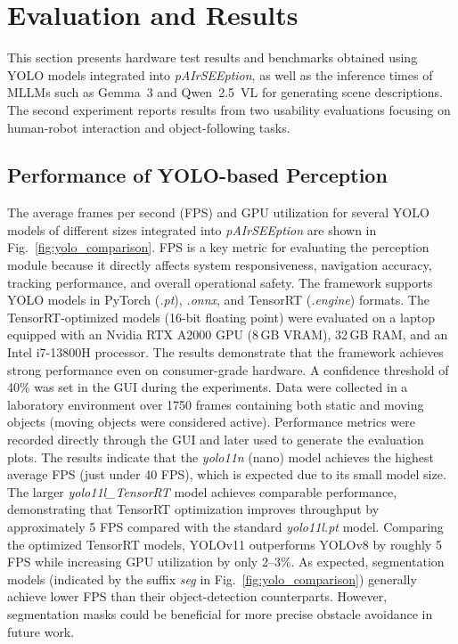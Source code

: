 \documentclass[lettersize,journal]{IEEEtran}
\begin{document}
\section{Evaluation and Results}
\label{sec:experiments}

This section presents hardware test results and benchmarks obtained using YOLO models integrated into \textit{pAIrSEEption}, as well as the inference times of MLLMs such as Gemma~3 and Qwen~2.5~VL for generating scene descriptions. The second experiment reports results from two usability evaluations focusing on human-robot interaction and object-following tasks.

\subsection{Performance of YOLO-based Perception}

The average frames per second (FPS) and GPU utilization for several YOLO models of different sizes integrated into \textit{pAIrSEEption} are shown in Fig.~\ref{fig:yolo_comparison}. FPS is a key metric for evaluating the perception module because it directly affects system responsiveness, navigation accuracy, tracking performance, and overall operational safety.
The framework supports YOLO models in PyTorch (\textit{.pt}), \textit{.onnx}, and TensorRT (\textit{.engine}) formats. The TensorRT-optimized models (16-bit floating point) were evaluated on a laptop equipped with an Nvidia RTX A2000 GPU (8\,GB VRAM), 32\,GB RAM, and an Intel i7-13800H processor. The results demonstrate that the framework achieves strong performance even on consumer-grade hardware.
A confidence threshold of 40\% was set in the GUI during the experiments. Data were collected in a laboratory environment over 1750 frames containing both static and moving objects (moving objects were considered active). Performance metrics were recorded directly through the GUI and later used to generate the evaluation plots.
The results indicate that the \textit{yolo11n} (nano) model achieves the highest average FPS (just under 40 FPS), which is expected due to its small model size. The larger \textit{yolo11l\_TensorRT} model achieves comparable performance, demonstrating that TensorRT optimization improves throughput by approximately 5 FPS compared with the standard \textit{yolo11l.pt} model. 
Comparing the optimized TensorRT models, YOLOv11 outperforms YOLOv8 by roughly 5 FPS while increasing GPU utilization by only 2–3\%. As expected, segmentation models (indicated by the suffix \textit{seg} in Fig.~\ref{fig:yolo_comparison}) generally achieve lower FPS than their object-detection counterparts. However, segmentation masks could be beneficial for more precise obstacle avoidance in future work.
\end{document}
